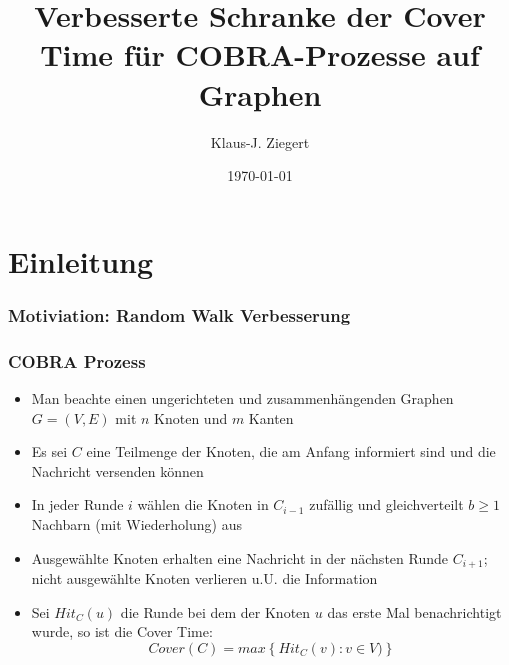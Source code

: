 \documentclass[presentation,xcolor=svgnames,9pt]{beamer}
\title[FGI3]{Verbesserte Schranke der Cover Time für COBRA-Prozesse auf
Graphen}
\author[Klaus-J. Ziegert]{Klaus-J. Ziegert}
\institute[]{Universität Hamburg\\
	Fakultät für Mathematik, Informatik und Naturwissenschaften\\
	Fachbereich Informatik}
\date{\today}
\begin{document}
	\begin{frame}
		\titlepage
	\end{frame}

	\section{Einleitung}

	\begin{frame}
	\frametitle{Motiviation: Random Walk Verbesserung}
	\end{frame}

	\begin{frame}
		\frametitle{COBRA Prozess}
		\begin{itemize}
			\item Man beachte einen ungerichteten und
				zusammenhängenden Graphen
				$G = (V,E)$ mit $n$ Knoten und
				$m$ Kanten
			\item Es sei $C$ eine Teilmenge der
				Knoten, die am Anfang
				informiert sind und die Nachricht
				versenden können
			\item In jeder Runde $i$ wählen die
				Knoten in $C_{i-1}$ zufällig und
				gleichverteilt $b \geq 1$
				Nachbarn (mit Wiederholung) aus
			\item Ausgewählte Knoten
				erhalten eine Nachricht in der nächsten Runde
				$C_{i+1}$; nicht
				ausgewählte Knoten verlieren u.U.
				die Information
			\item Sei $Hit_{C}(u)$ die Runde bei dem
				der
				Knoten $u$ das erste Mal
				benachrichtigt wurde, so ist die
				Cover Time: 
				\[
				Cover(C) =
				max\left\{
					Hit_{C}(v) : v \in V)
				\right\}
				\]
		\end{itemize}
	\end{frame}
\end{document}
